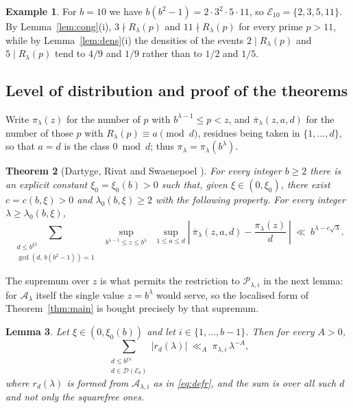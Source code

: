 \documentclass[11pt,a4paper]{article}
\theoremstyle{plain}
\newtheorem{theorem}{Theorem}[section]
\newtheorem{lemma}[theorem]{Lemma}
\theoremstyle{definition}
\newtheorem{example}[theorem]{Example}
\numberwithin{equation}{section}
\begin{document}
\begin{example}\label{ex:base10}
For $b=10$ we have $b(b^{2}-1)=2\cdot3^{2}\cdot5\cdot11$, so $\mathcal E_{10}=\{2,3,5,11\}$. By
Lemma~\ref{lem:cong}(i), $3\nmid R_\lambda(p)$ and $11\nmid R_\lambda(p)$ for every prime $p>11$, while
by Lemma~\ref{lem:dens}(i) the densities of the events $2\mid R_\lambda(p)$ and $5\mid R_\lambda(p)$
tend to $4/9$ and $1/9$ rather than to $1/2$ and $1/5$.
\end{example}

\subsection{Level of distribution and proof of the theorems}

Write $\pi_\lambda(z)$ for the number of $p$ with $b^{\lambda-1}\le p<z$, and
$\overline\pi_\lambda(z,a,d)$ for the number of those $p$ with $R_\lambda(p)\equiv a\pmod d$, residues
being taken in $\{1,\dots,d\}$, so that $a=d$ is the class $0\bmod d$; thus
$\pi_\lambda=\pi_\lambda(b^{\lambda})$.

\begin{theorem}[Dartyge, Rivat and Swaenepoel {\cite[Thm.~1.3]{DRS}}]\label{thm:drs}
For every integer $b\ge2$ there is an explicit constant $\xi_0=\xi_0(b)>0$ such that, given
$\xi\in(0,\xi_0)$, there exist $c=c(b,\xi)>0$ and $\lambda_0(b,\xi)\ge2$ with the following property. For
every integer $\lambda\ge\lambda_0(b,\xi)$,
\[
\sum_{\substack{d\le b^{\xi\lambda}\\ \gcd(d,\,b(b^{2}-1))=1}}\ \
\sup_{b^{\lambda-1}\le z\le b^{\lambda}}\ \ \sup_{1\le a\le d}
\left|\ \overline\pi_\lambda(z,a,d)-\frac{\pi_\lambda(z)}{d}\ \right|
\ \ll\ b^{\lambda-c\sqrt{\lambda}} .
\]
\end{theorem}

The supremum over $z$ is what permits the restriction to $\mathcal P_{\lambda,i}$ in the next lemma:
for $\mathcal A_\lambda$ itself the single value $z=b^{\lambda}$ would serve, so the localised form of
Theorem~\ref{thm:main} is bought precisely by that supremum.

\begin{lemma}\label{lem:hyp2}
Let $\xi\in(0,\xi_0(b))$ and let $i\in\{1,\dots,b-1\}$. Then for every $A>0$,
\[
\sum_{\substack{d\le b^{\xi\lambda}\\ d\in\mathcal D(\mathcal E_b)}}\bigl|r_d(\lambda)\bigr|
\ \ll_A\ \pi_{\lambda,i}\,\lambda^{-A},
\]
where $r_d(\lambda)$ is formed from $\mathcal A_{\lambda,i}$ as in \eqref{eq:defr}, and the sum is over all
such $d$ and not only the squarefree ones.
\end{lemma}
\end{document}
